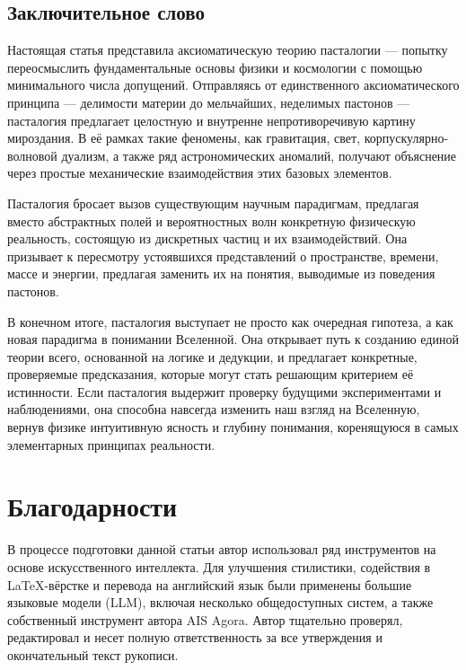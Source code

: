 \documentclass[pdflatex,sn-mathphys-num,referee]{sn-jnl}
\begin{document}
\subsection{Заключительное слово}\label{subsec:conclusion}

Настоящая статья представила аксиоматическую теорию пасталогии --- попытку переосмыслить фундаментальные основы физики и космологии с помощью минимального числа допущений. Отправляясь от единственного аксиоматического принципа --- делимости материи до мельчайших, неделимых пастонов --- пасталогия предлагает целостную и внутренне непротиворечивую картину мироздания. В её рамках такие феномены, как гравитация, свет, корпускулярно-волновой дуализм, а также ряд астрономических аномалий, получают объяснение через простые механические взаимодействия этих базовых элементов.

Пасталогия бросает вызов существующим научным парадигмам, предлагая вместо абстрактных полей и вероятностных волн конкретную физическую реальность, состоящую из дискретных частиц и их взаимодействий. Она призывает к пересмотру устоявшихся представлений о пространстве, времени, массе и энергии, предлагая заменить их на понятия, выводимые из поведения пастонов.

В конечном итоге, пасталогия выступает не просто как очередная гипотеза, а как новая парадигма в понимании Вселенной. Она открывает путь к созданию единой теории всего, основанной на логике и дедукции, и предлагает конкретные, проверяемые предсказания, которые могут стать решающим критерием её истинности. Если пасталогия выдержит проверку будущими экспериментами и наблюдениями, она способна навсегда изменить наш взгляд на Вселенную, вернув физике интуитивную ясность и глубину понимания, коренящуюся в самых элементарных принципах реальности.

\backmatter

\section*{Благодарности}\label{sec:acknowledgements}

В процессе подготовки данной статьи автор использовал ряд инструментов на основе искусственного интеллекта. Для улучшения стилистики, содействия в LaTeX-вёрстке и перевода на английский язык были применены большие языковые модели (LLM), включая несколько общедоступных систем, а также собственный инструмент автора AIS Agora. Автор тщательно проверял, редактировал и несет полную ответственность за все утверждения и окончательный текст рукописи.
\end{document}
